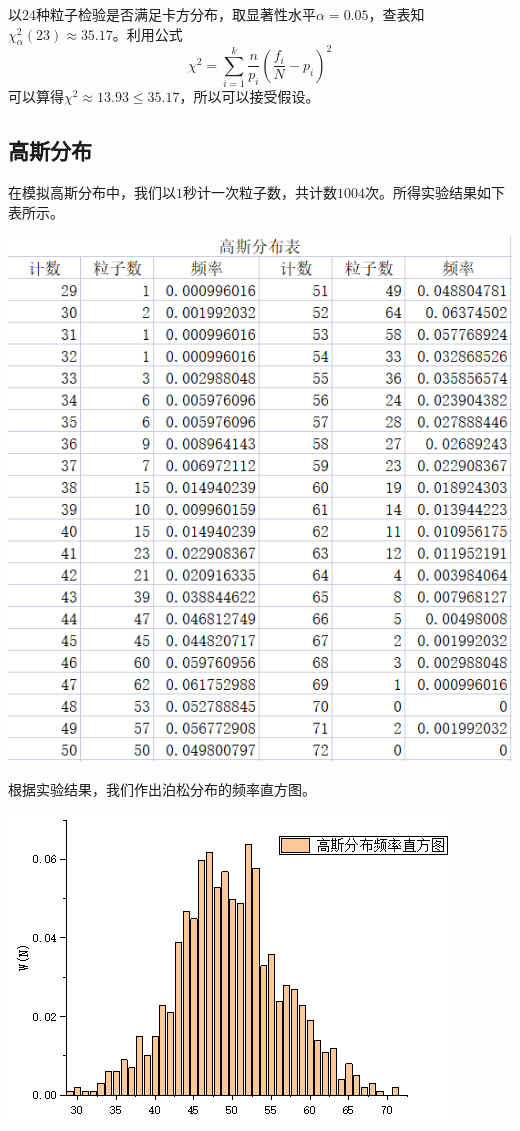 \documentclass[hyperref]{ctexart}
\begin{document}
\begin{multicols}{2}
以$24$种粒子检验是否满足卡方分布，取显著性水平$\alpha=0.05$，查表知$\chi^2_{\alpha}(23)\approx 35.17$。利用公式\begin{equation}\chi^2=\sum^k_{i=1} \frac{n}{p_i}(\frac{f_i}{N}-p_i)^2 \label{gll}\end{equation}可以算得$\chi^2 \approx 13.93 \le 35.17$，所以可以接受假设。
\subsection{高斯分布}
在模拟高斯分布中，我们以$1$秒计一次粒子数，共计数$1004$次。所得实验结果如下表所示。

\begin{center} \includegraphics[scale=0.4]{gsbg.png} \label{gsbg} \end{center}

根据实验结果，我们作出泊松分布的频率直方图。

\begin{center}\includegraphics[scale=0.4]{gsfb.png} \end{center}


\end{multicols}
\end{document}
